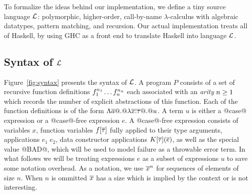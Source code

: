 To formalize the ideas behind our implementation, we define a
tiny source language $\cal L$:
polymorphic, higher-order, call-by-name $\lambda$-calculus with
algebraic datatypes, pattern matching, and recursion.  
Our actual implementation treats all of Haskell, by using GHC as a front 
end to translate Haskell into language $\cal L$.

\subsection{Syntax of $\cal L$} \label{s:syntax}

Figure~\ref{fig:syntax} presents the syntax of $\cal L$. 
A program $P$ consists of a set of recursive 
function definitions $f_1^{n_1}\ldots f_n^{n_n}$ each associated with an {\em arity} $n \geq 1$ 
which records the number of explicit abstractions of this function. Each of the function definitions
is of the form $\Lambda\overline{a} @.@ \lambda \overline{x{:}\tau} @.@ u$. A term $u$ is either a @case@ expression 
or a @case@-free expression $e$. A @case@-free expression consists of variables $x$, function variables 
$f[\overline{\tau}]$ fully applied to their type arguments, applications $e_1\;e_2$, data constructor 
applications $K[\overline{\tau}](\overline{e})$, as well as the special value @BAD@, which will be used to model 
failure as a throwable error term. In what follows we will be treating expressions $e$ as a subset 
of expressions $u$ to save some notation overhead. As a notation, we use $\overline{x}^{n}$ for sequences
of elements of size $n$. When $n$ is ommitted $\overline{x}$ has a size which is implied by the context or 
is not interesting.

